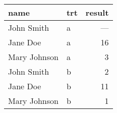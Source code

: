 \begin{tabular}{llr}
  \toprule
 name & trt & result \\ 
  \midrule
  John Smith & a & --- \\ 
  Jane Doe & a &  16 \\ 
  Mary Johnson & a &   3 \\ 
  John Smith & b &   2 \\ 
  Jane Doe & b &  11 \\ 
  Mary Johnson & b &   1 \\ 
   \bottomrule
\end{tabular}
